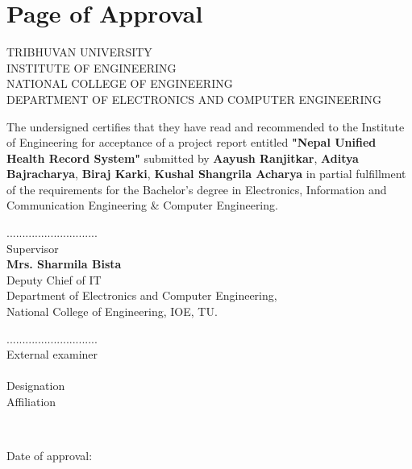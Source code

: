 \documentclass[12pt]{report}
\numberwithin{equation}{chapter}
\begin{document}


\setcounter{page}{2}

\chapter*{Page of Approval}
\vspace{1.5cm}
\begin{center}
\uppercase{
Tribhuvan University\\
Institute of Engineering\\
National College of Engineering\\
Department of Electronics and Computer Engineering
    }
    \end{center}
\vspace{.5cm}
The undersigned certifies that they have read and recommended to the Institute of Engineering for acceptance of a project report entitled \textbf{"Nepal Unified Health Record System"} submitted by \textbf{Aayush Ranjitkar}, \textbf{Aditya Bajracharya}, \textbf{Biraj Karki}, \textbf{Kushal Shangrila Acharya} in partial fulfillment of the requirements for the Bachelor's degree in Electronics, Information and Communication Engineering \& Computer Engineering.\\

\vspace{1cm}
\begin{minipage}{.5\textwidth}
        \raggedright
    .............................\\
    Supervisor\\
    \textbf{Mrs. Sharmila Bista}\\
    Deputy Chief of IT\\
    Department of Electronics and Computer Engineering,\\
    National College of Engineering, IOE, TU.\\
    \end{minipage}%
    \begin{minipage}{0.5\textwidth}
    \raggedleft
    .............................\\
    External examiner\\
    ~\\
    Designation \\
    Affiliation\\
    \end{minipage}\\
 \newline
 \newline
 \newline
\centerline{Date of approval:}
\end{document}
